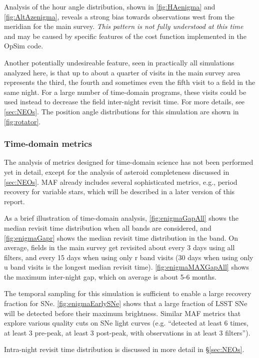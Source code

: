 Analysis of the hour angle distribution, shown in
\autoref{fig:HAenigma} and \autoref{fig:AltAzenigma}, reveals a strong
bias towards observations west from the meridian for the main survey.
{\it This pattern is not fully understood at this time} and may be
caused by specific features of the cost function implemented in the
OpSim code.

Another potentially undesireable feature, seen in practically all
simulations analyzed here, is that up to about a quarter of visits in
the main survey area represents the third, the fourth and sometimes
even the fifth visit to a field in the same night. For a large number
of time-domain programs, these visits could be used instead to
decrease the field inter-night revisit time. For more details, see
\autoref{sec:NEOs}. The position angle distributions for this simulation
are shown in \autoref{fig:rotator}.


\subsubsection{Time-domain metrics}

The analysis of metrics designed for time-domain science has not been
performed yet in detail, except for the analysis of asteroid
completeness discussed in \autoref{sec:NEOs}. MAF already includes
several sophisticated metrics, e.g., period recovery for variable
stars, which will be described in a later version of this report.

As a brief illustration of time-domain analysis,
\autoref{fig:enigmaGapAll} shows the median revisit time distribution
when all bands are considered, and \autoref{fig:enigmaGapr} shows the
median revisit time distribution in the band.  On average, fields in
the main survey get revisited about every 3 days using all filters,
and every 15 days when using only r band visits (30 days when using
only u band visits is the longest median revisit time).
\autoref{fig:enigmaMAXGapAll} shows the maximum inter-night gap, which
on average is about 5-6 months.

The temporal sampling for this simulation is sufficient to enable a
large recovery fraction for SNe. \autoref{fig:enigmaEarlySNe} shows
that a large fraction of LSST SNe will be detected before their
maximum brightness. Similar MAF metrics that explore various quality
cuts on SNe light curves (e.g. ``detected at least 6 times, at least 3
pre-peak, at least 3 post-peak, with observations in at least 3
filters'').

Intra-night revisit time distribution is discussed in more detail in
\S\ref{sec:NEOs}.



